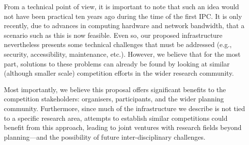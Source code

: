 From a technical point of view, it is important to note that such an idea
would not have been practical ten years ago during the time of the first
IPC. It is only recently, due to advances in computing hardware and network
bandwidth, that a scenario such as this is now feasible. Even so, our
proposed infrastructure nevertheless presents some technical challenges
that must be addressed (e.g., security, accessibility, maintenance,
etc.). However, we believe that for the most part, solutions to these
problems can already be found by looking at similar (although smaller
scale) competition efforts in the wider research community.

Most importantly, we believe this proposal offers significant benefits to
the competition stakeholders: organisers, participants, and the wider
planning community. Furthermore, since much of the infrastructure we
describe is not tied to a specific research area, attempts to establish
similar competitions could benefit from this approach, leading to joint
ventures with research fields beyond planning---and the
possibility of future inter-disciplinary challenges.



